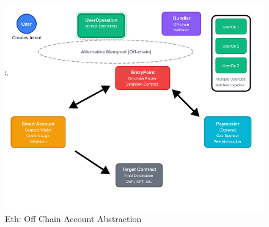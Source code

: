 \documentclass[../Main.tex]{subfiles}
\begin{document}
\begin{figure}[H]
    \centering
    \includegraphics[width=0.75\linewidth]{Images/blockchain/erc-4337.png}
    \caption{Eth: Off Chain Account Abstraction}
\end{figure}
\end{document}
